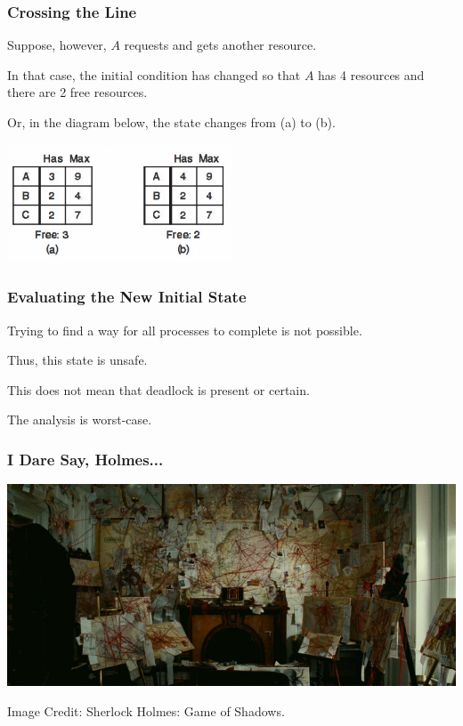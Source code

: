 \begin{frame}
	\frametitle{Crossing the Line}

	Suppose, however, $A$ requests and gets another resource.

	In that case, the initial condition has changed so that $A$ has 4 resources and there are 2 free resources.

	Or, in the diagram below, the state changes from (a) to (b).

	\begin{center}
		\includegraphics[width=0.5\textwidth]{images/unsafe-state-initial.png}
	\end{center}


\end{frame}

\begin{frame}
	\frametitle{Evaluating the New Initial State}

	Trying to find a way for all processes to complete is not possible.

	Thus, this state is unsafe.

	This does not mean that deadlock is present or certain.

	The analysis is worst-case.

\end{frame}


\begin{frame}
	\frametitle{I Dare Say, Holmes...}

	\begin{center}
		\includegraphics[width=\textwidth]{images/sherlock-wall.png}
	\end{center}
	\hfill Image Credit: Sherlock Holmes: Game of Shadows.
\end{frame}


